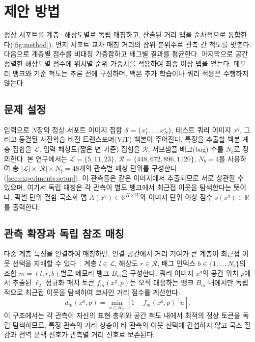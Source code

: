 \section{제안 방법}
\label{sec:method}

 정상 서포트를 계층·해상도별로 독립 매칭하고, 산출된 거리 맵을 순차적으로 통합한다(\cref{fig:method}).
먼저 서포트 교차 매칭 거리의 상위 분위수로 관측 간 척도를 맞춘다.
다음으로 계층별 점수를 비대칭 가중합하고 배그별 결과를 평균한다.
마지막으로 공간 정렬한 해상도별 점수에 위치별 순위 가중치를 적용하여 최종 이상 맵을 얻는다.
메모리 뱅크와 기준 척도는 추론 전에 구성하며, 백본 추가 학습이나 쿼리 적응은 수행하지 않는다.

\subsection{문제 설정}
\label{sec:method:overview}

입력으로 $N$장의 정상 서포트 이미지 집합 $\mathcal{S} = \{x_1^s, \dots, x_N^s\}$, 테스트 쿼리 이미지 $x^q$, 그리고 동결된 사전학습 비전 트랜스포머(ViT) 백본이 주어진다.
특징을 추출할 백본 계층 집합을 $\mathcal{L}$, 입력 해상도(짧은 변 기준) 집합을 $\mathcal{R}$, 서브샘플 배그(bag) 수를 $N_b$로 정의한다.
본 연구에서는 $\mathcal{L}=\{5, 11, 23\}$, $\mathcal{R}=\{448, 672, 896, 1120\}$, $N_b=4$를 사용하여 총 $|\mathcal{L}| \times |\mathcal{R}| \times N_b = 48$개의 관측별 매칭 단위를 구성한다(\cref{sec:experiments:setup}). 이 관측들은 같은 이미지에서 추출되므로 서로 상관될 수 있으며, 여기서 독립 매칭은 각 관측이 별도 뱅크에서 최근접 이웃을 탐색한다는 뜻이다.
 픽셀 단위 결함 국소화 맵 $A(x^q) \in \mathbb{R}^{H \times W}$와 이미지 단위 이상 점수 $s(x^q) \in \mathbb{R}$를 출력한다.

\subsection{관측 확장과 독립 참조 매칭}
\label{sec:method:expansion}

다중 계층 특징을 연결하여 매칭하면, 연결 공간에서 거리 기여가 큰 계층이 최근접 이웃 선택을 지배할 수 있다~\cite{patchcore}.
 계층 $l \in \mathcal{L}$, 해상도 $r \in \mathcal{R}$, 배그 인덱스 $b \in \{1, \dots, N_b\}$의 조합 $m = (l, r, b)$별로 메모리 뱅크 $B_m$을 구성한다.
쿼리 이미지 $x^q$의 공간 위치 $p$에서 추출된 $\ell_2$ 정규화 패치 토큰 $f_m(x^q, p)$는 오직 대응하는 뱅크 $B_m$ 내에서만 독립적으로 최근접 이웃을 탐색하여 코사인 거리 점수를 계산한다:
\begin{equation}
  d_m(x^q, p) = \min_{u \in B_m} \left[ 1 - f_m(x^q, p)^\top u \right].
  \label{eq:cosine-dist}
\end{equation}
이 구조에서는 각 관측이 자신의 표현 층위와 공간 척도 내에서 최적의 정상 토큰을 독립 탐색하므로, 특정 관측의 거리 상승이 타 관측의 이웃 선택에 간섭하지 않고 국소 질감과 전역 문맥 신호가 관측별 거리 신호로 보존된다.

